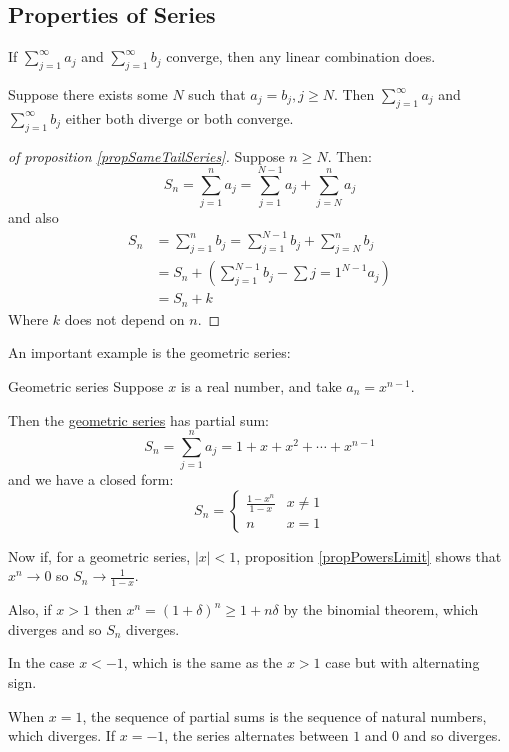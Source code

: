 \documentclass[../Main.tex]{subfiles}
\begin{document}
\subsection{Properties of Series}
\begin{propositions}{
        \label{eqnSeriesProperties}
    }
    \item If $\sum_{j=1}^\infty a_j$ and $\sum_{j=1}^\infty b_j$ converge, then any linear combination does. \label{propSeriesLinearCombo}
    \item Suppose there exists some $N$ such that $a_j = b_j, j \geq N$.
        Then $\sum_{j=1}^\infty a_j$ and $\sum_{j=1}^\infty b_j$ either both diverge or both converge. \label{propSameTailSeries}
\end{propositions}
\begin{proof}[of proposition \ref{propSameTailSeries}]
    Suppose $n \geq N$. Then:
    \begin{equation*}
        S_n = \sum_{j=1}^n a_j = \sum_{j=1}^{N-1}a_j + \sum_{j=N}^{n} a_j
    \end{equation*}
    and also
    \begin{align*}
        S_n &= \sum_{j=1}^n b_j = \sum_{j=1}^{N-1}b_j + \sum_{j=N}^{n} b_j \\
        &= S_n + \left(\sum_{j=1}^{N-1} b_j - \sum{j=1}^{N-1} a_j\right) \\
        &= S_n + k
    \end{align*}
    Where $k$ does not depend on $n$.
\end{proof}
An important example is the geometric series:
\begin{definition}{Geometric series}
    Suppose $x$ is a real number, and take $a_n = x^{n-1}$.\par
    Then the \underline{geometric series} has partial sum:
    \begin{equation*}
        S_n = \sum_{j=1}^n a_j = 1 + x + x^2 + \cdots + x^{n-1}
    \end{equation*}
    and we have a closed form:
    \begin{equation*}
        S_n =
        \begin{cases}
            \frac{1 - x^n}{1 - x} & x \neq 1 \\
            n & x = 1
        \end{cases}
    \end{equation*}
\end{definition}
Now if, for a geometric series, $|x| < 1$, proposition \ref{propPowersLimit} shows that $x^n \to 0$ so $S_n \to \frac{1}{1-x}$.\par
Also, if $x > 1$ then $x^n = (1 + \delta)^n \geq 1 + n\delta$ by the binomial theorem, which diverges and so $S_n$ diverges.\par
In the case $x < -1$, which is the same as the $x > 1$ case but with alternating sign.\par
When $x = 1$, the sequence of partial sums is the sequence of natural numbers, which diverges. If $x = -1$, the series alternates between $1$ and $0$ and so diverges.
\end{document}
